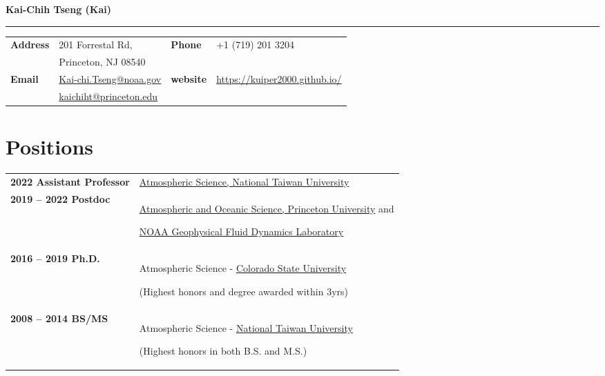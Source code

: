 \documentclass{article}
\begin{document}
{\huge\color{airforceblue}\textbf{Kai-Chih Tseng (Kai)}\par}
\rule{\textwidth}{0.5mm}\par

\vspace{5ex}

\begin{tabular}{
		>{\bfseries}p{.20\linewidth}
		p{.4\linewidth}
		>{\bfseries}p{.1\linewidth}
		p{.25\linewidth}
	}
	Address       & 201 Forrestal Rd,          &  Phone  & +1 (719) 201 3204 \\
	              & Princeton, NJ 08540          &    &  \\
	Email         & \href{mailto:Kai-chi.Tseng@noaa.gov}{Kai-chi.Tseng@noaa.gov} & website & \href{https://kuiper2000.github.io/}{https://kuiper2000.github.io/}    \\
                  & \href{mailto:kaichiht@princeton.edu}{kaichiht@princeton.edu} &       &     \\
\end{tabular}

\section{\color{airforceblue}Positions}
\begin{tabular}{>{\bfseries}p{5cm}p{\linewidth-2.5cm\relax}}
	2022 Assistant Professor   & \href{https://www.princeton.edu/}{Atmospheric Science, National Taiwan University}\par 
	\\
	2019  -- 2022 Postdoc & \href{https://www.princeton.edu/}{Atmospheric and Oceanic Science, Princeton University} and \par \href{https://www.gfdl.noaa.gov/}{NOAA Geophysical Fluid Dynamics Laboratory} \par
    \\
	2016 -- 2019 Ph.D. & Atmospheric Science -
	\href{https://www.colostate.edu/}{Colorado State University} \par
	(Highest honors and degree awarded within 3yrs) \par
	\\
	2008 -- 2014 BS/MS & Atmospheric Science - \href{https://www.ntu.edu.tw/}{National Taiwan University} \par 
	(Highest honors in both B.S. and M.S.) 

\end{tabular}
\end{document}
